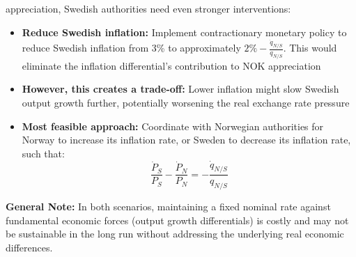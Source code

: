 appreciation, Swedish authorities need even stronger interventions:
\begin{itemize} \item \textbf{Reduce Swedish inflation:} Implement
contractionary monetary policy to reduce Swedish inflation from 3\% to
approximately $2\% - \frac{\dot{q}_{N/S}}{q_{N/S}}$. This would eliminate the
inflation differential's contribution to NOK appreciation \item \textbf{However,
this creates a trade-off:} Lower inflation might slow Swedish output growth
further, potentially worsening the real exchange rate pressure \item
\textbf{Most feasible approach:} Coordinate with Norwegian authorities for
Norway to increase its inflation rate, or Sweden to decrease its inflation rate,
such that: \[ \frac{\dot{P}_S}{P_S} - \frac{\dot{P}_N}{P_N} =
-\frac{\dot{q}_{N/S}}{q_{N/S}} \] \end{itemize} \textbf{General Note:} In both
scenarios, maintaining a fixed nominal rate against fundamental economic forces
(output growth differentials) is costly and may not be sustainable in the long
run without addressing the underlying real economic differences.
